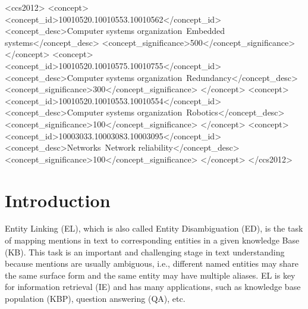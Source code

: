 \documentclass[sigconf]{acmart}
\begin{document}
\begin{CCSXML}
<ccs2012>
 <concept>
  <concept_id>10010520.10010553.10010562</concept_id>
  <concept_desc>Computer systems organization~Embedded systems</concept_desc>
  <concept_significance>500</concept_significance>
 </concept>
 <concept>
  <concept_id>10010520.10010575.10010755</concept_id>
  <concept_desc>Computer systems organization~Redundancy</concept_desc>
  <concept_significance>300</concept_significance>
 </concept>
 <concept>
  <concept_id>10010520.10010553.10010554</concept_id>
  <concept_desc>Computer systems organization~Robotics</concept_desc>
  <concept_significance>100</concept_significance>
 </concept>
 <concept>
  <concept_id>10003033.10003083.10003095</concept_id>
  <concept_desc>Networks~Network reliability</concept_desc>
  <concept_significance>100</concept_significance>
 </concept>
</ccs2012>
\end{CCSXML}



\maketitle

\section{Introduction}
Entity Linking (EL), which is also called Entity Disambiguation (ED), is the task of mapping mentions in text to corresponding entities in a given knowledge Base (KB). This task is an important and challenging stage in text understanding because mentions are usually ambiguous, i.e., different named entities may share the same surface form and the same entity may have multiple aliases. EL is key for information retrieval (IE) and has many applications, such as knowledge base population (KBP), question answering (QA), etc.
\end{document}
